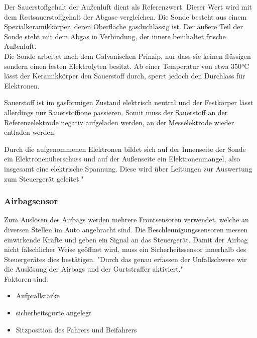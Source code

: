\documentclass{article}
\begin{document}
				\begin{flushleft}
					Der Sauerstoffgehalt der Außenluft dient als Referenzwert. Dieser Wert wird mit dem Restsauerstoffgehalt der Abgase vergleichen. Die Sonde besteht aus einem Spezialkeramikkörper, deren Oberfläche gasduchlässig ist. Der äußere Teil der Sonde steht mit dem Abgas in Verbindung, der innere beinhaltet frische Außenluft.\\
					Die Sonde arbeitet nach dem Galvanischen Prinzip, nur dass sie keinen flüssigen sondern einen festen Elektrolyten besitzt. Ab einer Temperatur von etwa 350°C lässt der Keramikkörper den Sauerstoff durch, sperrt jedoch den Durchlass für Elektronen.
					
					Sauerstoff ist im gasförmigen Zustand elektrisch neutral und der Festkörper lässt allerdings nur Sauerstoffione passieren. Somit muss der Sauerstoff an der Referenzelektrode negativ aufgeladen werden, an der Messelektrode wieder entladen werden.
					
					Durch die aufgenommenen Elektronen bildet sich auf der Innenseite der Sonde ein Elektronenüberschuss und auf der Außenseite ein Elektronenmangel, also insgesamt eine elektrische Spannung. Diese wird über Leitungen zur Auswertung zum Steuergerät geleitet."\cite{TS31}
				\end{flushleft}
			
			\subsubsection{Airbagsensor}
					Zum Auslösen des Airbags werden mehrere Frontsensoren verwendet, welche an diversen Stellen im Auto angebracht sind. Die Beschleunigungssensoren messen einwirkende Kräfte und geben ein Signal an das Steuergerät. Damit der Airbag nicht fälschlicher Weise geöffnet wird, muss ein Sicherheitssensor innerhalb des Steuergerätes dies bestätigen. "Durch das genau erfassen der Unfallschwere wir die Auslösung der Airbags und der Gurtstraffer aktiviert."\cite{TS32}\\
					Faktoren sind: 
					
					\begin{itemize}
						\item Aufprallstärke
						\item sicherheitsgurte angelegt
						\item Sitzposition des Fahrers und Beifahrers
					\end{itemize}
				
				
\end{document}
